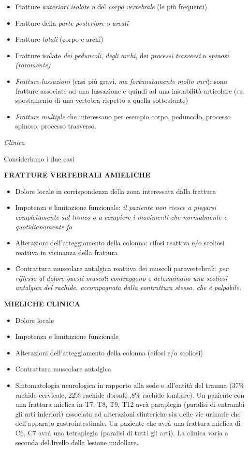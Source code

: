 \documentclass[]{article}
\begin{document}
\begin{itemize}
\item
  Fratture \emph{anteriori isolate} o del \emph{corpo vertebrale} (le
  più frequenti)
\item
  Fratture della \emph{parte posteriore} o \emph{arcali}
\item
  Fratture \emph{totali} (corpo e archi)
\item
  Fratture isolate \emph{dei peduncoli}, \emph{\emph{degli archi}}, dei
  \emph{processi trasversi} o \emph{spinosi (raramente)}
\item
  \emph{Fratture-lussazioni} (casi più gravi, \emph{ma fortunatamente
  molto rari}): sono fratture associate ad una lussazione e quindi ad
  una instabilità articolare (es. spostamento di una vertebra rispetto a
  quella sottostante)
\item
  \emph{Fratture multiple} che interessano per esempio corpo, peduncolo,
  processo spinoso, processo trasverso.
\end{itemize}

\emph{Clinica}

Consideriamo i due casi

\textbf{FRATTURE VERTEBRALI AMIELICHE }

\begin{itemize}
\item
  Dolore locale in corrispondenza della zona interessata dalla frattura
\item
  Impotenza e limitazione funzionale: \emph{il paziente non riesce a
  piegarsi completamente sul tronco o a compiere i movimenti che
  normalmente e quotidianamente fa}
\item
  Alterazioni dell'atteggiamento della colonna: cifosi reattiva e/o
  scoliosi reattiva in vicinanza della frattura
\item
  Contrattura muscolare antalgica reattiva dei muscoli paravertebrali:
  \emph{per riflesso al dolore questi muscoli contraggono e determinano
  una \emph{scoliosi antalgica} del rachide, accompagnata dalla
  contrattura stessa, che è palpabile.}
\end{itemize}

\textbf{MIELICHE CLINICA }

\begin{itemize}
\item
  Dolore locale
\item
  Impotenza e limitazione funzionale
\item
  Alterazioni dell'atteggiamento della colonna (cifosi e/o scoliosi)
\item
  Contrattura muscolare antalgica
\item
  Sintomatologia neurologica in rapporto alla sede e all'entità del
  trauma (37\% rachide cervicale, 22\% rachide dorsale ,8\% rachide
  lombare). Un paziente con una frattura mielica in T7, T8, T9, T12 avrà
  paraplegia (paralisi di entrambi gli arti inferiori) associata ad
  alterazioni sfinteriche sia delle vie urinarie che dell'apparato
  gastrointestinale. Un paziente che avrà una frattura mielica di C6, C7
  avrà una tetraplegia (paralisi di tutti gli arti). La clinica varia a
  seconda del livello della lesione midollare.
\end{itemize}
\end{document}
